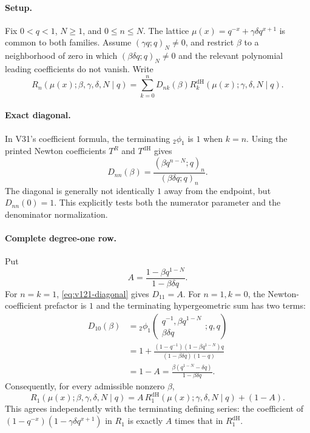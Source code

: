 \documentclass[11pt]{article}
\begin{document}
\paragraph{Setup.} Fix $0<q<1$, $N\ge1$, and $0\le n\le N$. The lattice $\mu(x)=q^{-x}+\gamma\delta q^{x+1}$ is common to both families. Assume $(\gamma q;q)_N\ne0$, and restrict $\beta$ to a neighborhood of zero in which $(\beta\delta q;q)_N\ne0$ and the relevant polynomial leading coefficients do not vanish. Write
\[
 R_n(\mu(x);\beta,\gamma,\delta,N\mid q)
 =\sum_{k=0}^n D_{nk}(\beta)R_k^{\mathrm{dH}}(\mu(x);\gamma,\delta,N\mid q).
\]

\paragraph{Exact diagonal.} In V31's coefficient formula, the terminating ${}_2\phi_1$ is $1$ when $k=n$. Using the printed Newton coefficients $T^R$ and $T^{\mathrm{dH}}$ gives
\begin{equation}\label{eq:v121-diagonal}
\boxed{D_{nn}(\beta)=\frac{(\beta q^{n-N};q)_n}{(\beta\delta q;q)_n}.}
\end{equation}
The diagonal is generally not identically $1$ away from the endpoint, but $D_{nn}(0)=1$. This explicitly tests both the numerator parameter and the denominator normalization.

\paragraph{Complete degree-one row.} Put
\[
 A=\frac{1-\beta q^{1-N}}{1-\beta\delta q}.
\]
For $n=k=1$, \eqref{eq:v121-diagonal} gives $D_{11}=A$. For $n=1,k=0$, the Newton-coefficient prefactor is $1$ and the terminating hypergeometric sum has two terms:
\begin{align*}
 D_{10}(\beta)
 &={}_2\phi_1\!\left(\begin{matrix}q^{-1},\beta q^{1-N}\\\beta\delta q\end{matrix};q,q\right)\\
 &=1+\frac{(1-q^{-1})(1-\beta q^{1-N})q}{(1-\beta\delta q)(1-q)}\\
 &=1-A=\frac{\beta(q^{1-N}-\delta q)}{1-\beta\delta q}.
\end{align*}
Consequently, for every admissible nonzero $\beta$,
\begin{equation}\label{eq:v121-degree-one}
\boxed{R_1(\mu(x);\beta,\gamma,\delta,N\mid q)
 =A\,R_1^{\mathrm{dH}}(\mu(x);\gamma,\delta,N\mid q)+(1-A).}
\end{equation}
This agrees independently with the terminating defining series: the coefficient of $(1-q^{-x})(1-\gamma\delta q^{x+1})$ in $R_1$ is exactly $A$ times that in $R_1^{\mathrm{dH}}$.
\end{document}
